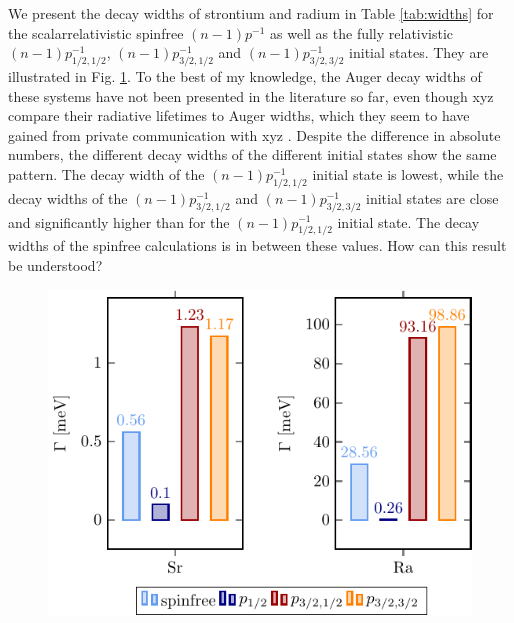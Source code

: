 We present the decay widths of strontium and radium in Table \ref{tab:widths}
for the scalarrelativistic spinfree $(n-1)p^{-1}$ as well as the
fully relativistic $(n-1)p_{1/2,1/2}^{-1}$, $(n-1)p_{3/2,1/2}^{-1}$ and
$(n-1)p_{3/2,3/2}^{-1}$ initial states. They are illustrated in Fig. \ref{fig:gamma}.
To the best of my knowledge, the Auger decay widths of these systems have
not been presented in the literature so far, even though xyz compare their
radiative lifetimes to Auger widths, which they seem to have gained
from private communication with xyz \cite{}.
Despite the difference in absolute numbers, the different decay widths
of the different initial states show the same pattern. The decay width of
the $(n-1)p_{1/2,1/2}^{-1}$ initial state is lowest, while the decay widths
of the $(n-1)p_{3/2,1/2}^{-1}$ and
$(n-1)p_{3/2,3/2}^{-1}$ initial states are close and significantly higher than
for the $(n-1)p_{1/2,1/2}^{-1}$ initial state. The decay widths of the
spinfree calculations is in between these values.
How can this result be understood?

\begin{figure}[h]
 \centering
 \includegraphics[width=0.95\columnwidth]{pics/gamma_group.pdf}
 \caption{}
 \label{fig:gamma}
\end{figure}

